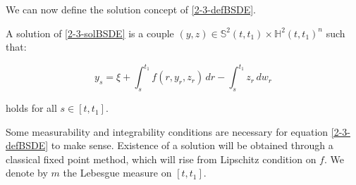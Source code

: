 We can now define the solution concept of \ref{2-3-defBSDE}.

\begin{definition}
    A solution of \ref{2-3-solBSDE} is a couple $(y,z)\in\mathbb{S}^2(t,t_1)\times\mathbb{H}^2(t,t_1)^n$ such that:
    
    \[y_s = \xi + \int_s^{t_1} f(r,y_r,z_r)\,dr - \int_s^{t_1} z_r\,dw_r\] 

    holds for all $s\in[t,t_1]$. 
\end{definition}

Some measurability and integrability conditions are necessary for equation \ref{2-3-defBSDE} to make sense. Existence 
of a solution will be obtained through a classical fixed point method, which will rise from Lipschitz condition on $f$. 
We denote by $m$ the Lebesgue measure on $[t,t_1]$.

